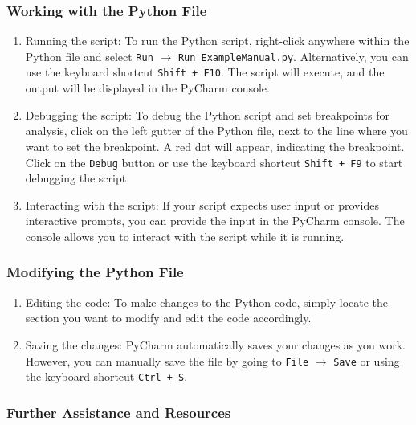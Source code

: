 \subsubsection{Working with the Python File}

\begin{enumerate}
	\item Running the script: To run the Python script, right-click anywhere within
	the Python file and select \texttt{Run} $\rightarrow$ \texttt{Run
		ExampleManual.py}. Alternatively, you can use the keyboard shortcut \texttt{Shift
		+ F10}. The script will execute, and the output will be displayed in the
	PyCharm console.
	
	\item Debugging the script: To debug the Python script and set breakpoints for
	analysis, click on the left gutter of the Python file, next to the line
	where you want to set the breakpoint. A red dot will appear, indicating the
	breakpoint. Click on the \texttt{Debug} button or use the keyboard shortcut
	\texttt{Shift + F9} to start debugging the script.
	
	\item Interacting with the script: If your script expects user input or
	provides interactive prompts, you can provide the input in the PyCharm console.
	The console allows you to interact with the script while it is running.
\end{enumerate}

\subsubsection{Modifying the Python File}

\begin{enumerate}
	\item Editing the code: To make changes to the Python code, simply locate the section
	you want to modify and edit the code accordingly.
	
	\item Saving the changes: PyCharm automatically saves your changes as you work.
	However, you can manually save the file by going to \texttt{File} $\rightarrow$
	\texttt{Save} or using the keyboard shortcut \texttt{Ctrl + S}.
\end{enumerate}

\subsubsection{Further Assistance and Resources}


